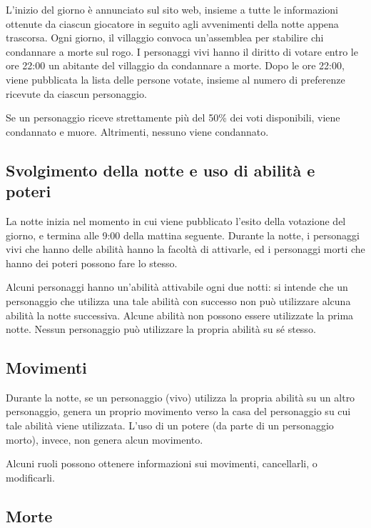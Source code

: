 \documentclass[a4paper,10pt]{article}
\begin{document}
L'inizio del giorno è annunciato sul sito web, insieme a tutte le informazioni ottenute da ciascun giocatore in seguito agli avvenimenti della notte appena trascorsa. Ogni giorno, il villaggio convoca un'assemblea per stabilire chi condannare a morte sul rogo. I personaggi vivi hanno il diritto di votare entro le ore 22:00 un abitante del villaggio da condannare a morte. Dopo le ore 22:00, viene pubblicata la lista delle persone votate, insieme al numero di preferenze ricevute da ciascun personaggio.

Se un personaggio riceve strettamente più del 50\% dei voti disponibili, viene condannato e muore. Altrimenti, nessuno viene condannato.

\subsection{Svolgimento della notte e uso di abilità e poteri}

La notte inizia nel momento in cui viene pubblicato l'esito della votazione del giorno, e termina alle 9:00 della mattina seguente. Durante la notte, i personaggi vivi che hanno delle abilità hanno la facoltà di attivarle, ed i personaggi morti che hanno dei poteri possono fare lo stesso.

Alcuni personaggi hanno un'abilità attivabile ogni due notti: si intende che un personaggio che utilizza una tale abilità con successo non può utilizzare alcuna abilità la notte successiva. Alcune abilità non possono essere utilizzate la prima notte. Nessun personaggio può utilizzare la propria abilità su sé stesso.


\subsection{Movimenti}

Durante la notte, se un personaggio (vivo) utilizza la propria abilità su un altro personaggio, genera un proprio movimento verso la casa del personaggio su cui tale abilità viene utilizzata. L'uso di un potere (da parte di un personaggio morto), invece, non genera alcun movimento.

Alcuni ruoli possono ottenere informazioni sui movimenti, cancellarli, o modificarli.

\subsection{Morte}
\end{document}

